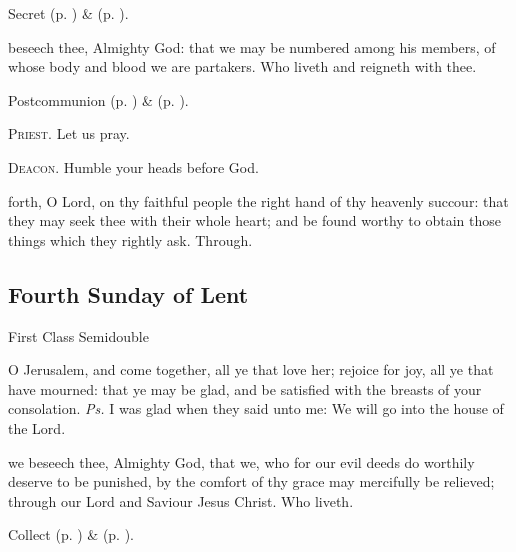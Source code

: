 \begin{rubric}
     Secret  (p. \pageref{AshWednesdayMassSecret}) \&   (p. \pageref{SPLivingDeparted}).
\end{rubric}


\postcommunion
{} beseech thee, Almighty God: that we may be numbered among his members, of whose body and blood we are partakers. Who liveth and reigneth with thee.

\begin{rubric}
     Postcommunion  (p. \pageref{AshWednesdayMassPostcommunion}) \&   (p. \pageref{SPLivingDeparted}).
\end{rubric}

\textsc{Priest.} Let us pray.\par
\textsc{Deacon.} Humble your heads before God.\par
{} forth, O Lord, on thy faithful people the right hand of thy heavenly succour: that they may seek thee with their whole heart; and be found worthy to obtain those things which they rightly ask. Through.


\subsection{Fourth Sunday of Lent}
\begin{inhead}
{First Class Semidouble}
\end{inhead}


\introit
{} O Jerusalem, and come together, all ye that love her; rejoice for joy, all ye that have mourned: that ye may be glad, and be satisfied with the breasts of your consolation. \textit{Ps.} I was glad when they said unto me: We will go into the house of the Lord.

\collect
{} we beseech thee, Almighty God, that we, who for our evil deeds do worthily deserve to be punished, by the comfort of thy grace may mercifully be relieved; through our Lord and Saviour Jesus Christ. Who liveth.
\begin{rubric}
     Collect  (p. \pageref{AshWednesdayMassCollect}) \&   (p. \pageref{SPLivingDeparted}).
\end{rubric}

